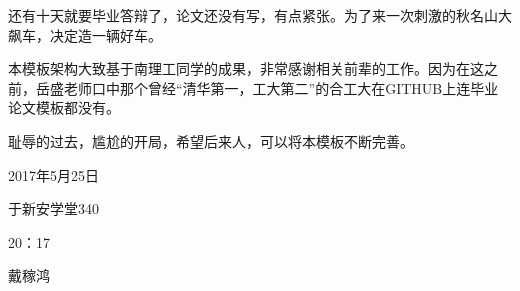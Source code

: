 \begin{thanks}

还有十天就要毕业答辩了，论文还没有写，有点紧张。为了来一次刺激的秋名山大飙车，决定造一辆好车。

本模板架构大致基于南理工同学的成果，非常感谢相关前辈的工作。因为在这之前，岳盛老师口中那个曾经“清华第一，工大第二”的合工大在GITHUB上连毕业论文模板都没有。

耻辱的过去，尴尬的开局，希望后来人，可以将本模板不断完善。
 \begin{flushright}
2017年5月25日

于新安学堂340

20：17

戴稼鸿
 
 \end{flushright}


\end{thanks}
